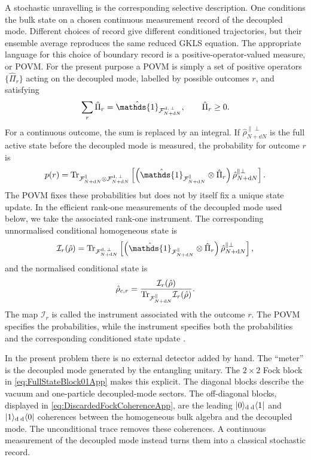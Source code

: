 \documentclass{article}
\def\cF{{\cal F}}
\newcommand{\openone}{\hat{\mathds{1}}}
\def\Tr{\mathrm{Tr}}
\numberwithin{equation}{section}
\begin{document}
	A stochastic unravelling is the corresponding selective description. One conditions the bulk state on a chosen continuous measurement record of the decoupled mode. Different choices of record give different conditioned trajectories, but their ensemble average reproduces the same reduced GKLS equation. The appropriate language for this choice of boundary record is a positive-operator-valued measure, or POVM. For the present purpose a POVM is simply a set of positive operators \(\{\hat\Pi_r\}\) acting on the decoupled mode, labelled by possible outcomes \(r\), and satisfying
	\begin{equation}
		\sum_r \hat\Pi_r=\openone_{\cF^{\rm d,\,\perp}_{N+\dd N}}, \qquad \hat\Pi_r\ge 0 .
	\end{equation}
	For a continuous outcome, the sum is replaced by an integral. If \(\hat\rho_{N+\dd N}^{\parallel\perp}\) is the full active state before the decoupled mode is measured, the probability for outcome \(r\) is
	\begin{equation}
		p(r) = \Tr_{\cF_{N+\dd N}^\parallel\otimes\cF^{\rm d,\,\perp}_{N+\dd N}} \left[ \left( \openone_{\cF_{N+\dd N}^\parallel}\otimes \hat\Pi_r \right) \hat\rho_{N+\dd N}^{\parallel\perp} \right].
	\end{equation}
	The POVM fixes these probabilities but does not by itself fix a unique state update. In the efficient rank-one measurements of the decoupled mode used below, we take the associated rank-one instrument. The corresponding unnormalised conditional homogeneous state is
	\begin{equation}
		\mathcal I_r(\hat\rho) = \Tr_{\cF^{\rm d,\,\perp}_{N+\dd N}} \left[ \left( \openone_{\cF_{N+\dd N}^\parallel}\otimes \hat\Pi_r \right) \hat\rho_{N+\dd N}^{\parallel\perp} \right],
		\label{eq:InstrumentIntroApp}
	\end{equation}
	and the normalised conditional state is
	\begin{equation}
		\hat\rho_{c,r} = \frac{\mathcal I_r(\hat\rho)} {\Tr_{\cF_{N+\dd N}^\parallel}\mathcal I_r(\hat\rho)} .
	\end{equation}
	The map \(\mathcal I_r\) is called the instrument associated with the outcome \(r\). The POVM specifies the probabilities, while the instrument specifies both the probabilities and the corresponding conditioned state update \cite{wiseman2009quantum}.

	In the present problem there is no external detector added by hand. The ``meter'' is the decoupled mode generated by the entangling unitary. The \(2\times2\) Fock block in \cref{eq:FullStateBlock01App} makes this explicit. The diagonal blocks describe the vacuum and one-particle decoupled-mode sectors. The off-diagonal blocks, displayed in \cref{eq:DiscardedFockCoherenceApp}, are the leading \(\ket{0}\!{}_{\rm d}\,{}_{\rm d}\!\bra{1}\) and \(\ket{1}\!{}_{\rm d}\,{}_{\rm d}\!\bra{0}\) coherences between the homogeneous bulk algebra and the decoupled mode. The unconditional trace removes these coherences. A continuous measurement of the decoupled mode instead turns them into a classical stochastic record.
\end{document}
